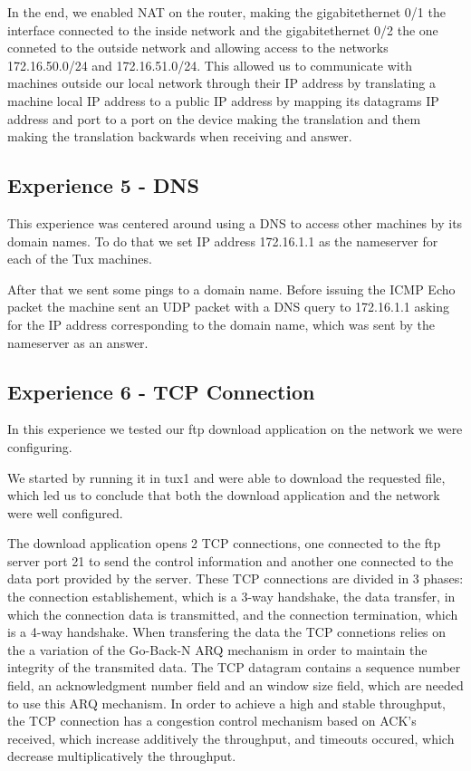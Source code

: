 \documentclass[11pt,a4paper,reqno]{article}
\numberwithin{equation}{section}
\begin{document}
In the end, we enabled NAT on the router, making the gigabitethernet 0/1 the interface connected to the inside network and the gigabitethernet 0/2 the one conneted to the outside network and allowing access to the networks 172.16.50.0/24 and 172.16.51.0/24. This allowed us to communicate with machines outside our local network through their IP address by translating a machine local IP address to a public IP address by mapping its datagrams IP address and port to a port on the device making the translation and them making the translation backwards when receiving and answer.

\subsection{Experience 5 - DNS}

This experience was centered around using a DNS to access other machines by its domain names. To do that we set IP address 172.16.1.1 as the nameserver for each of the Tux machines.

After that we sent some pings to a domain name. Before issuing the ICMP Echo packet the machine sent an UDP packet with a DNS query to 172.16.1.1 asking for the IP address corresponding to the domain name, which was sent by the nameserver as an answer.

\subsection{Experience 6 - TCP Connection}

In this experience we tested our ftp download application on the network we were configuring.

We started by running it in tux1 and were able to download the requested file, which led us to conclude that both the download application and the network were well configured.

The download application opens 2 TCP connections, one connected to the ftp server port 21 to send the control information and another one connected to the data port provided by the server. These TCP connections are divided in 3 phases: the connection establishement, which is a 3-way handshake, the data transfer, in which the connection data is transmitted, and the connection termination, which is a 4-way handshake. When transfering the data the TCP connetions relies on the a variation of the Go-Back-N ARQ mechanism in order to maintain the integrity of the transmited data. The TCP datagram contains a sequence number field, an acknowledgment number field and an window size field, which are needed to use this ARQ mechanism. In order to achieve a high and stable throughput, the TCP connection has a congestion control mechanism based on ACK’s received, which increase additively the throughput, and timeouts occured, which decrease multiplicatively the throughput.
\end{document}
